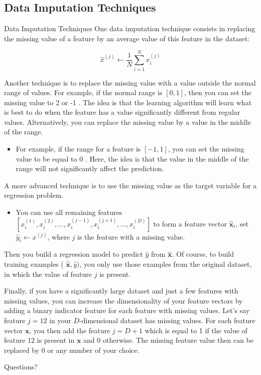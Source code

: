 \documentclass[9pt,dvipsnames]{beamer}
\begin{document}
	\subsection{Data Imputation Techniques}
	\begin{frame}{Data Imputation Techniques}
		One data imputation technique consists in replacing the missing value of a feature by an average value of this feature in the dataset:
		
		$$
		\hat{x}^{(j)} \leftarrow \frac{1}{N} \sum_{i=1}^{N} x_{i}^{(j)}
		$$
		
		Another technique is to replace the missing value with a value outside the normal range of values. For example, if the normal range is $[0,1]$, then you can set the missing value to 2 or -1 . The idea is that the learning algorithm will learn what is best to do when the feature has a value significantly different from regular values. Alternatively, you can replace the missing value by a value in the middle of the range. 
		\begin{itemize}
			\item For example, if the range for a feature is $[-1,1]$, you can set the missing value to be equal to 0 . Here, the idea is that the value in the middle of the range will not significantly affect the prediction.
		\end{itemize}

	\end{frame}
	
	\begin{frame}
		A more advanced technique is to use the missing value as the target variable for a regression problem. 
		\begin{itemize}
			\item You can use all remaining features $\left[x_{i}^{(1)}, x_{i}^{(2)}, \ldots, x_{i}^{(j-1)}, x_{i}^{(j+1)}, \ldots, x_{i}^{(D)}\right]$ to form a feature vector $\hat{\mathbf{x}}_{i}$, set $\hat{y}_{i} \leftarrow x^{(j)}$, where $j$ is the feature with a missing value.
		\end{itemize}
		 Then you build a regression model to predict $\hat{y}$ from $\hat{\mathbf{x}}$. Of course, to build training examples ( $\hat{\mathbf{x}}, \hat{y})$, you only use those examples from the original dataset, in which the value of feature $j$ is present.
		
		Finally, if you have a significantly large dataset and just a few features with missing values, you can increase the dimensionality of your feature vectors by adding a binary indicator feature for each feature with missing values. Let's say feature $j=12$ in your $D$-dimensional dataset has missing values. For each feature vector $\mathbf{x}$, you then add the feature $j=D+1$ which is equal to 1 if the value of feature 12 is present in $\mathbf{x}$ and 0 otherwise. The missing feature value then can be replaced by 0 or any number of your choice.
	\end{frame}
	
	\begin{frame}
		\begin{center}
			\Huge Questions?
		\end{center}
	\end{frame}
\end{document}
